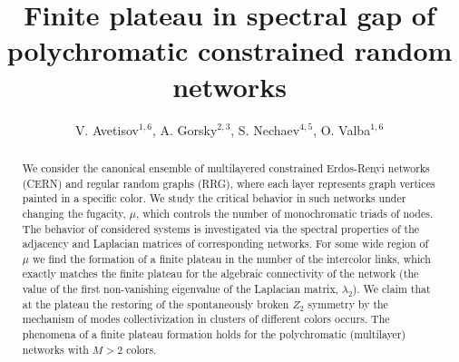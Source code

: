 \documentclass[aps,12pt]{revtex4}
\begin{document}
\title{Finite plateau in spectral gap of polychromatic constrained random networks}

\author{V. Avetisov$^{1,6}$, A. Gorsky$^{2,3}$, S. Nechaev$^{4,5}$, O. Valba$^{1,6}$}

\address{$^{1}$N.N. Semenov Institute of Chemical Physics of the Russian Academy
of Sciences, 119991, Moscow, Russia \\
$^2$Institute of Information Transmission Problems of the Russian Academy of Sciences,
Moscow, Russia, \\
$^3$Moscow Institute of Physics and Technology, Dolgoprudny 141700, Russia \\
$^4$ Interdisciplinary Scientific Center Poncelet (CNRS UMI 2615), Moscow, Russia \\
$^5$P.N. Lebedev Physical Institute of the Russian Academy of Sciences, 119991, Moscow, Russia \\
$^6$Department of Applied Mathematics, National Research University Higher School of Economics, 101000, Moscow, Russia.}

\begin{abstract}

We consider the canonical ensemble of multilayered constrained Erdos-Renyi networks (CERN) and regular random graphs (RRG), where each layer represents graph vertices painted in a specific color. We study the critical behavior in such networks under changing the fugacity, $\mu$, which controls the number of monochromatic triads of nodes. The behavior of considered systems is investigated via the spectral  properties of the adjacency and Laplacian matrices of corresponding networks.
For some wide region of $\mu$ we find the formation of a finite plateau in the number of the intercolor links, which exactly matches the finite plateau for the algebraic connectivity of the network (the value of the first non-vanishing eigenvalue of the Laplacian matrix, $\lambda_2$). We claim that at the plateau the restoring of the spontaneously broken $Z_2$ symmetry by the mechanism of modes collectivization in clusters of different colors occurs. The phenomena of a finite plateau formation holds for the polychromatic (multilayer) networks with $M>2$ colors.

\end{abstract}
\end{document}

